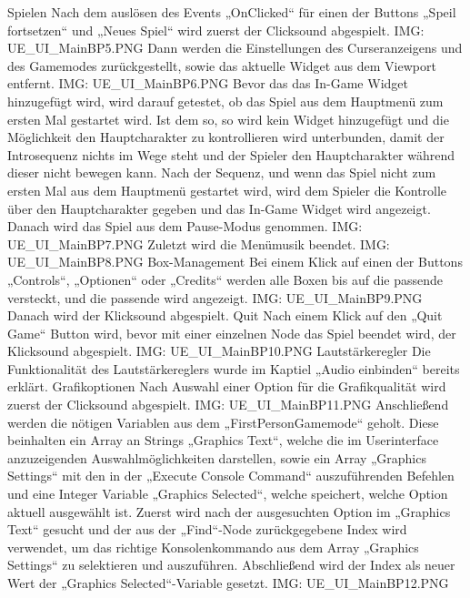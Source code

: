 Spielen
Nach dem auslösen des Events „OnClicked“ für einen der Buttons „Speil fortsetzen“ und „Neues Spiel“ wird zuerst der Clicksound abgespielt.
{IMG: UE_UI_MainBP5.PNG}
Dann werden die Einstellungen des Curseranzeigens und des Gamemodes zurückgestellt, sowie das aktuelle Widget aus dem Viewport entfernt.
{IMG: UE_UI_MainBP6.PNG}
Bevor das das In-Game Widget hinzugefügt wird, wird darauf getestet, ob das Spiel aus dem Hauptmenü zum ersten Mal gestartet wird. Ist dem so, so wird kein Widget hinzugefügt und die Möglichkeit den Hauptcharakter zu kontrollieren wird unterbunden, damit der Introsequenz nichts im Wege steht und der Spieler den Hauptcharakter während dieser nicht bewegen kann. Nach der Sequenz, und wenn das Spiel nicht zum ersten Mal aus dem Hauptmenü gestartet wird, wird dem Spieler die Kontrolle über den Hauptcharakter gegeben und das In-Game Widget wird angezeigt.
Danach wird das Spiel aus dem Pause-Modus genommen.
{IMG: UE_UI_MainBP7.PNG}
Zuletzt wird die Menümusik beendet.
{IMG: UE_UI_MainBP8.PNG}
Box-Management
Bei einem Klick auf einen der Buttons „Controls“, „Optionen“ oder „Credits“ werden alle Boxen bis auf die passende versteckt, und die passende wird angezeigt.
{IMG: UE_UI_MainBP9.PNG}
Danach wird der Klicksound abgespielt.
Quit
Nach einem Klick auf den „Quit Game“ Button wird, bevor mit einer einzelnen Node das Spiel beendet wird, der Klicksound abgespielt.
{IMG: UE_UI_MainBP10.PNG}
Lautstärkeregler
Die Funktionalität des Lautstärkereglers wurde im Kaptiel „Audio einbinden“ bereits erklärt.
Grafikoptionen
Nach Auswahl einer Option für die Grafikqualität wird zuerst der Clicksound abgespielt.
{IMG: UE_UI_MainBP11.PNG}
Anschließend werden die nötigen Variablen aus dem „FirstPersonGamemode“ geholt. Diese beinhalten ein Array an Strings „Graphics Text“, welche die im Userinterface anzuzeigenden Auswahlmöglichkeiten darstellen, sowie ein Array „Graphics Settings“ mit den in der „Execute Console Command“ auszuführenden Befehlen und eine Integer Variable „Graphics Selected“, welche speichert, welche Option aktuell ausgewählt ist.
Zuerst wird nach der ausgesuchten Option im „Graphics Text“ gesucht und der aus der „Find“-Node zurückgegebene Index wird verwendet, um das richtige Konsolenkommando aus dem Array „Graphics Settings“ zu selektieren und auszuführen. Abschließend wird der Index als neuer Wert der „Graphics Selected“-Variable gesetzt.
{IMG: UE_UI_MainBP12.PNG}

